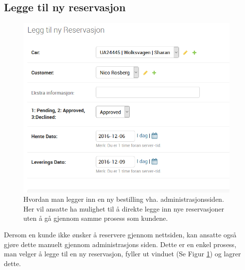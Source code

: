 \subsection*{Legge til ny reservasjon}




\begin{figure}[h!]
\begin{flushright}
\begin{minipage}{0.4\textwidth}
\begin{center}
    \includegraphics[width=1.2\textwidth]{Bilder/admin_ny_reservasjon.png}
    \caption[Ny reservasjon fra administrasjonsside]{Hvordan man legger inn en ny bestilling vha. administrasjonssiden. Her vil ansatte ha mulighet til å direkte legge inn nye reservasjoner uten å gå gjennom samme prosess som kundene.}
    \label{fig:admin_new_res}
\end{center}
\end{minipage}
\end{flushright}
\end{figure}


%
\vspace{-7cm}
%
\begin{flushleft}
\begin{minipage}{0.5\textwidth}

%
%
Dersom en kunde ikke ønsker å reservere gjennom nettsiden, kan ansatte også gjøre dette manuelt gjennom administrasjons siden. Dette er en enkel prosess, man velger å legge til en ny reservasjon, fyller ut vinduet (Se Figur \ref{fig:admin_new_res}) og lagrer dette.

\end{minipage}
\end{flushleft}

